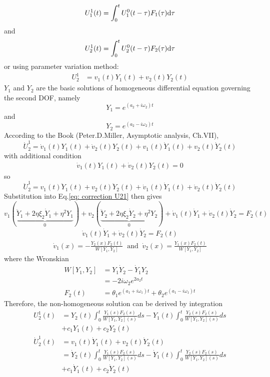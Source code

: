 \documentclass{article}
\begin{document}
\[U_1^1(t)=\int_0^t U_1^0(t-\tau) F_1(\tau) \rm{d}\tau\] and \[U_2^1(t)=\int_0^t U_2^0(t-\tau) F_2(\tau) \rm{d}\tau\] or using parameter variation method:
\begin{align}
    U_2^1&=v_1(t) Y_1(t) +v_2(t) Y_2(t)%
\end{align}
$Y_1$ and $Y_2$ are the basic solutions of homogeneous differential equation governing the second DOF, namely $$\displaystyle Y_1=e^{(a_2+i\omega_2)t}$$ and $$Y_2=e^{(a_2-i\omega_2)t}$$ According to the Book (Peter.D.Miller, Asymptotic analysis, Ch.VII),
$$\dot{U}_2^1=\dot{v}_1(t) Y_1(t) +\dot{v}_2(t) Y_2(t) + v_1(t) \dot{Y}_1(t) +v_2(t) \dot{Y}_2(t)$$ with additional condition 
\begin{align}
\boxed{\dot{v}_1(t) Y_1(t) +\dot{v}_2(t) Y_2(t)=0}
\end{align}
so $$ \ddot{U}_2^1=v_1(t) \ddot{Y}_1(t) +v_2(t) \ddot{Y}_2(t)+\dot{v}_1(t) \dot{Y}_1(t) +\dot{v}_2(t) \dot{Y}_2(t)$$
Substitution into Eq.\ref{eq: correction U21} then gives 
\[ v_1(\underbrace{\ddot{Y}_1+2 \eta \xi_2 \dot{Y}_1 +\eta^2 Y_1}_0)+v_2(\underbrace{\ddot{Y}_2+2 \eta \xi_2 \dot{Y}_2 +\eta^2 Y_2}_0)+\dot{v}_1(t) \dot{Y}_1 +\dot{v}_2(t) \dot{Y}_2=F_2(t)\]
%
\begin{align}
   \boxed{\dot{v}_1(t) \dot{Y}_1 +\dot{v}_2(t) \dot{Y}_2=F_2(t) }
\end{align}
%
\begin{align}
\dot{v}_{1}(x)=-\frac{Y_{2}(x) F_2(t)}{W\left[Y_{1}, Y_{2}\right]}~
\text { and } ~ 
\dot{v}_{2}(x)=\frac{Y_{1}(x) F_2(t)}{W\left[Y_{1}, Y_{2}\right]}
\end{align}
where the Wronskian 
\begin{align}
    \nonumber
    W\left[Y_1,Y_2\right] &=Y_1 \dot{Y}_2-\dot{Y}_1 Y_2\\
    &=-2i\omega_2 e^{2a_2 t}\\
    F_2(t)&=\theta_1 e^{(a_1 + i\omega_1)t}+\theta_2 e^{(a_1-i \omega_1)t}
\end{align}
Therefore, the non-homogeneous solution can be derived by integration
\begin{align}
    \nonumber
    U_2^1(t)&= Y_{2} (t) \int_{0}^{t} \frac{Y_{1}(s) F_2(s)}{W\left[Y_{1}, Y_{2}\right](s)} d s-Y_{1}(t) \int_{0}^{t} \frac{Y_{2}(s) F_2(s)}{W\left[Y_{1}, Y_{2}\right](s)} d s \\
    &+c_{1} Y_{1}(t)+c_{2} Y_{2}(t)\\ \nonumber
    \dot{U}_2^1(t)&= v_1(t) \dot{Y}_1(t) +v_2(t) \dot{Y}_2(t)\\ \nonumber
     &=\dot{Y}_{2} (t) \int_{0}^{t} \frac{Y_{1}(s) F_2(s)}{W\left[Y_{1}, Y_{2}\right](s)} d s-\dot{Y}_{1}(t) \int_{0}^{t} \frac{Y_{2}(s) F_2(s)}{W\left[Y_{1}, Y_{2}\right](s)} d s \\
    &+c_{1} \dot{Y}_{1}(t)+c_{2} \dot{Y}_{2}(t)
\end{align}
%
\end{document}
